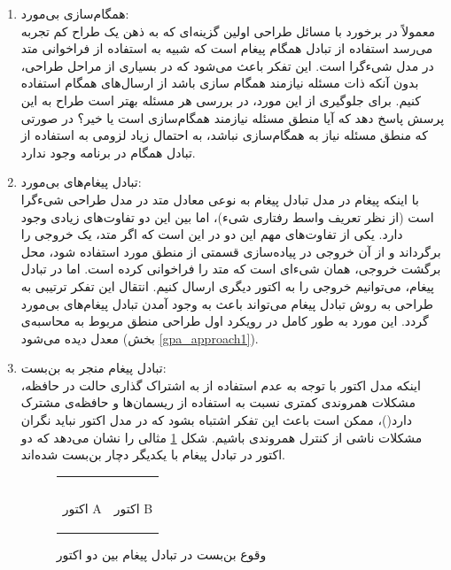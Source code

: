 \begin{enumerate}
\item همگام‌سازی بی‌مورد:\\
معمولاً در برخورد با مسائل طراحی اولین گزینه‌ای که به ذهن یک طراح کم تجربه می‌رسد استفاده از تبادل همگام پیغام است که شبیه به استفاده از فراخوانی متد در مدل شیءگرا است. این تفکر باعث می‌شود که در بسیاری از مراحل طراحی، بدون آنکه ذات مسئله نیازمند همگام سازی باشد از ارسال‌های همگام استفاده کنیم. برای جلوگیری از این مورد، در بررسی هر مسئله بهتر است طراح به این پرسش پاسخ دهد که آیا منطق مسئله نیازمند همگام‌سازی است یا خیر؟ در صورتی که منطق مسئله نیاز به همگام‌سازی نباشد، به احتمال زیاد لزومی به استفاده از تبادل همگام در برنامه وجود ندارد.

\item تبادل پیغام‌های بی‌مورد:\\
 با اینکه پیغام در مدل تبادل پیغام به نوعی معادل متد در مدل طراحی شیءگرا است (از نظر تعریف واسط رفتاری شیء)، اما بین این دو تفاوت‌های زیادی وجود دارد. یکی از تفاوت‌های مهم این دو در این است که اگر متد، یک خروجی‌ را برگرداند و از آن خروجی در پیاده‌سازی قسمتی از منطق مورد استفاده شود، محل برگشت خروجی، همان شی‌ءای است که متد را فراخوانی کرده است. اما در تبادل پیغام،‌ می‌توانیم خروجی را به اکتور دیگری ارسال کنیم. انتقال این تفکر ترتیبی به طراحی به روش تبادل پیغام می‌تواند باعث به وجود آمدن تبادل پیغام‌های بی‌مورد گردد. این مورد به طور کامل در رویکرد اول طراحی منطق مربوط به محاسبه‌ی معدل دیده می‌شود (بخش \ref{gpa_approach1}). 
 
 \item تبادل پیغام منجر به بن‌بست:\\
  اینکه مدل اکتور با توجه به عدم استفاده از به اشتراک گذاری حالت در حافظه، مشکلات همروندی کمتری نسبت به استفاده از ریسمان‌ها و حافظه‌ی مشترک دارد(\cite{WhyThreadsAreABadIdea})، ممکن است باعث این تفکر اشتباه بشود که در مدل اکتور نباید نگران مشکلات ناشی از کنترل همروندی باشیم. شکل \ref{fig:deadlock1} مثالی را نشان می‌دهد که دو اکتور در تبادل پیغام با یکدیگر دچار بن‌بست شده‌اند.
\begin{figure}
    \begin{center}
    \begin{tabular}{|m{6cm}|m{6cm}|}
      	\hline
	 & \\
	\begin{latin}
\linespread{1.1}

\end{latin} & 
 \begin{latin}
	\linespread{1.1}
		
\end{latin}
 	\\
	\begin{center}اکتور A\end{center}       &  \begin{center} اکتور B\end{center}            \\
	\hline
    \end{tabular}
    \end{center}
    \caption{\label{fig:deadlock1}  وقوع بن‌بست در تبادل پیغام بین دو اکتور}
\end{figure}


\end{enumerate}

